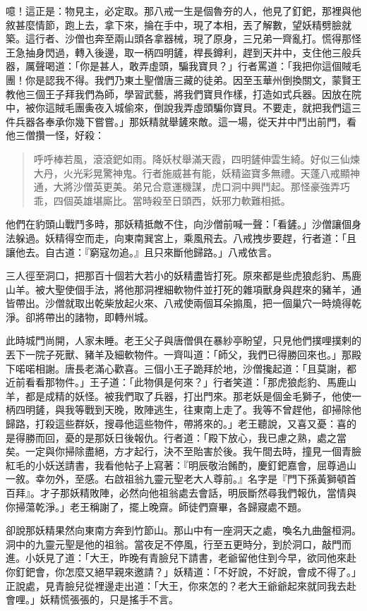 噫！這正是：物見主，必定取。那八戒一生是個魯夯的人，他見了釘鈀，那裡與他敘甚麼情節，跑上去，拿下來，掄在手中，現了本相，丟了解數，望妖精劈臉就築。這行者、沙僧也奔至兩山頭各拿器械，現了原身，三兄弟一齊亂打。慌得那怪王急抽身閃過，轉入後邊，取一柄四明鏟，桿長鐏利，趕到天井中，支住他三般兵器，厲聲喝道：「你是甚人，敢弄虛頭，騙我寶貝？」行者罵道：「我把你這個賊毛團！你是認我不得。我們乃東土聖僧唐三藏的徒弟。因至玉華州倒換關文，蒙賢王教他三個王子拜我們為師，學習武藝，將我們寶貝作樣，打造如式兵器。因放在院中，被你這賊毛團夤夜入城偷來，倒說我弄虛頭騙你寶貝。不要走，就把我們這三件兵器各奉承你幾下嘗嘗。」那妖精就舉鏟來敵。這一場，從天井中鬥出前門，看他三僧攢一怪，好殺：
\begin{quote}
呼呼棒若風，滾滾鈀如雨。降妖杖舉滿天霞，四明鏟伸雲生綺。好似三仙煉大丹，火光彩晃驚神鬼。行者施威甚有能，妖精盜寶多無禮。天蓬八戒顯神通，大將沙僧英更美。弟兄合意運機謀，虎口洞中興鬥起。那怪豪強弄巧乖，四個英雄堪廝比。當時殺至日頭西，妖邪力軟難相抵。
\end{quote}

他們在豹頭山戰鬥多時，那妖精抵敵不住，向沙僧前喊一聲：「看鏟。」沙僧讓個身法躲過。妖精得空而走，向東南巽宮上，乘風飛去。八戒拽步要趕，行者道：「且讓他去。自古道：『窮寇勿追。』且只來斷他歸路。」八戒依言。

三人徑至洞口，把那百十個若大若小的妖精盡皆打死。原來都是些虎狼彪豹、馬鹿山羊。被大聖使個手法，將他那洞裡細軟物件並打死的雜項獸身與趕來的豬羊，通皆帶出。沙僧就取出乾柴放起火來、八戒使兩個耳朵搧風，把一個巢穴一時燒得乾淨。卻將帶出的諸物，即轉州城。

此時城門尚開，人家未睡。老王父子與唐僧俱在暴紗亭盼望，只見他們撲哩撲剌的丟下一院子死獸、豬羊及細軟物件。一齊叫道：「師父，我們已得勝回來也。」那殿下喏喏相謝。唐長老滿心歡喜。三個小王子跪拜於地，沙僧攙起道：「且莫謝，都近前看看那物件。」王子道：「此物俱是何來？」行者笑道：「那虎狼彪豹、馬鹿山羊，都是成精的妖怪。被我們取了兵器，打出門來。那老妖是個金毛獅子，他使一柄四明鏟，與我等戰到天晚，敗陣逃生，往東南上走了。我等不曾趕他，卻掃除他歸路，打殺這些群妖，搜尋他這些物件，帶將來的。」老王聽說，又喜又憂：喜的是得勝而回，憂的是那妖日後報仇。行者道：「殿下放心，我已慮之熟，處之當矣。一定與你掃除盡絕，方才起行，決不至貽害於後。我午間去時，撞見一個青臉紅毛的小妖送請書，我看他帖子上寫著：『明辰敬治餚酌，慶釘鈀嘉會，屈尊過山一敘。幸勿外，至感。右啟祖翁九靈元聖老大人尊前。』名字是『門下孫黃獅頓首百拜』。才子那妖精敗陣，必然向他祖翁處去會話，明辰斷然尋我們報仇，當情與你掃蕩乾淨。」老王稱謝了，擺上晚齋。師徒們齋畢，各歸寢處不題。

卻說那妖精果然向東南方奔到竹節山。那山中有一座洞天之處，喚名九曲盤桓洞。洞中的九靈元聖是他的祖翁。當夜足不停風，行至五更時分，到於洞口，敲門而進。小妖見了道：「大王，昨晚有青臉兒下請書，老爺留他住到今早，欲同他來赴你釘鈀會，你怎麼又絕早親來邀請？」妖精道：「不好說，不好說，會成不得了。」正說處，見青臉兒從裡邊走出道：「大王，你來怎的？老大王爺爺起來就同我去赴會哩。」妖精慌張張的，只是搖手不言。

